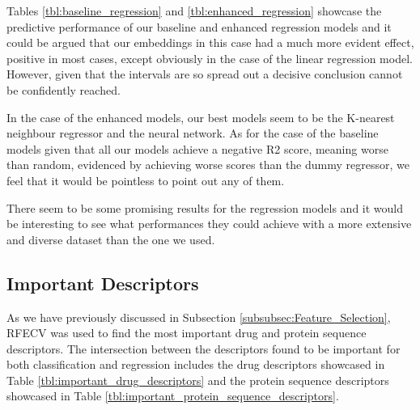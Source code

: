 Tables \ref{tbl:baseline_regression} and \ref{tbl:enhanced_regression} showcase the predictive performance of our baseline and enhanced regression models and it could be argued that our embeddings in this case had a much more evident effect, positive in most cases, except obviously in the case of the linear regression model. However, given that the intervals are so spread out a decisive conclusion cannot be confidently reached.

In the case of the enhanced models, our best models seem to be the K-nearest neighbour regressor and the neural network. As for the case of the baseline models given that all our models achieve a negative R2 score, meaning worse than random, evidenced by achieving worse scores than the dummy regressor, we feel that it would be pointless to point out any of them.

There seem to be some promising results for the regression models and it would be interesting to see what performances they could achieve with a more extensive and diverse dataset than the one we used.

\subsection{Important Descriptors}

As we have previously discussed in Subsection \ref{subsubsec:Feature_Selection}, RFECV was used to find the most important drug and protein sequence descriptors. The intersection between the descriptors found to be important for both classification and regression includes the drug descriptors showcased in Table \ref{tbl:important_drug_descriptors} and the protein sequence descriptors showcased in Table \ref{tbl:important_protein_sequence_descriptors}.

